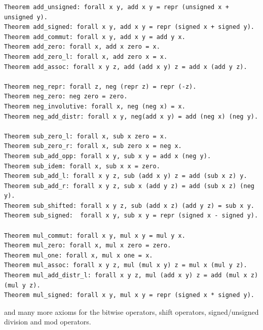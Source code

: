 \documentclass[12pt,fleqn,openany,oneside,showtrims]{memoir}
\begin{document}
\begin{lstlisting}
Theorem add_unsigned: forall x y, add x y = repr (unsigned x + unsigned y).
Theorem add_signed: forall x y, add x y = repr (signed x + signed y).
Theorem add_commut: forall x y, add x y = add y x.
Theorem add_zero: forall x, add x zero = x.
Theorem add_zero_l: forall x, add zero x = x.
Theorem add_assoc: forall x y z, add (add x y) z = add x (add y z).

Theorem neg_repr: forall z, neg (repr z) = repr (-z).
Theorem neg_zero: neg zero = zero.
Theorem neg_involutive: forall x, neg (neg x) = x.
Theorem neg_add_distr: forall x y, neg(add x y) = add (neg x) (neg y).

Theorem sub_zero_l: forall x, sub x zero = x.
Theorem sub_zero_r: forall x, sub zero x = neg x.
Theorem sub_add_opp: forall x y, sub x y = add x (neg y).
Theorem sub_idem: forall x, sub x x = zero.
Theorem sub_add_l: forall x y z, sub (add x y) z = add (sub x z) y.
Theorem sub_add_r: forall x y z, sub x (add y z) = add (sub x z) (neg y).
Theorem sub_shifted: forall x y z, sub (add x z) (add y z) = sub x y.
Theorem sub_signed:  forall x y, sub x y = repr (signed x - signed y).

Theorem mul_commut: forall x y, mul x y = mul y x.
Theorem mul_zero: forall x, mul x zero = zero.
Theorem mul_one: forall x, mul x one = x.
Theorem mul_assoc: forall x y z, mul (mul x y) z = mul x (mul y z).
Theorem mul_add_distr_l: forall x y z, mul (add x y) z = add (mul x z) (mul y z).
Theorem mul_signed: forall x y, mul x y = repr (signed x * signed y).
\end{lstlisting}
and many more axioms for the bitwise operators, shift operators,
signed/unsigned division and mod operators.
\end{document}
